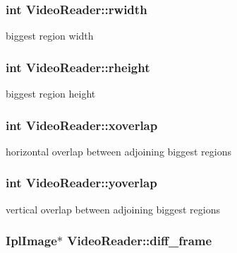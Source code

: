\subsubsection{\setlength{\rightskip}{0pt plus 5cm}int {\bf VideoReader::rwidth}\hspace{0.3cm}{\tt  [private]}}\label{classVideoReader_7a4d7b70657ed12d623cacdf63ec5e18}


biggest region width 

\subsubsection{\setlength{\rightskip}{0pt plus 5cm}int {\bf VideoReader::rheight}\hspace{0.3cm}{\tt  [private]}}\label{classVideoReader_ba0220e93ecb9d65d50b9418048c0b92}


biggest region height 

\subsubsection{\setlength{\rightskip}{0pt plus 5cm}int {\bf VideoReader::xoverlap}\hspace{0.3cm}{\tt  [private]}}\label{classVideoReader_38f091bdf64e9a1ff945bcc8c1f27e66}


horizontal overlap between adjoining biggest regions 

\subsubsection{\setlength{\rightskip}{0pt plus 5cm}int {\bf VideoReader::yoverlap}\hspace{0.3cm}{\tt  [private]}}\label{classVideoReader_67f9b2d416d5c952555500fe3a26787d}


vertical overlap between adjoining biggest regions 

\subsubsection{\setlength{\rightskip}{0pt plus 5cm}IplImage$\ast$ {\bf VideoReader::diff\_\-frame}\hspace{0.3cm}{\tt  [private]}}\label{classVideoReader_62cb9a99192ff45b5519e585314b6212}


